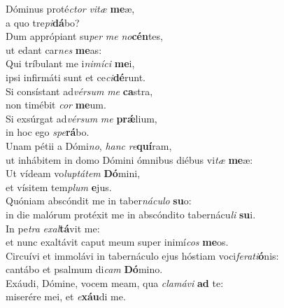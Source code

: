 \evenverse Dóminus proté\textit{ctor} \textit{vi}\textit{tæ} \textbf{me}æ,~\*\\
\evenverse a quo tre\textit{pi}\textbf{dá}bo?\\
\oddverse Dum apprópiant su\textit{per} \textit{me} \textit{no}\textbf{cén}tes,~\*\\
\oddverse ut edant car\textit{nes} \textbf{me}as:\\
\evenverse Qui tríbulant me i\textit{ni}\textit{mí}\textit{ci} \textbf{me}i,~\*\\
\evenverse ipsi infirmáti sunt et ce\textit{ci}\textbf{dé}runt.\\
\oddverse Si consístant ad\textit{vér}\textit{sum} \textit{me} \textbf{ca}stra,~\*\\
\oddverse non timébit \textit{cor} \textbf{me}um.\\
\evenverse Si exsúrgat ad\textit{vér}\textit{sum} \textit{me} \textbf{prǽ}lium,~\*\\
\evenverse in hoc ego \textit{spe}\textbf{rá}bo.\\
\oddverse Unam pétii a Dómi\textit{no}, \textit{hanc} \textit{re}\textbf{quí}ram,~\*\\
\oddverse ut inhábitem in domo Dómini ómnibus diébus vi\textit{tæ} \textbf{me}æ:\\
\evenverse Ut vídeam vo\textit{lup}\textit{tá}\textit{tem} \textbf{Dó}mini,~\*\\
\evenverse et vísitem tem\textit{plum} \textbf{e}jus.\\
\oddverse Quóniam abscóndit me in taber\textit{ná}\textit{cu}\textit{lo} \textbf{su}o:~\*\\
\oddverse in die malórum protéxit me in abscóndito tabernácu\textit{li} \textbf{su}i.\\
\evenverse In pe\textit{tra} \textit{e}\textit{xal}\textbf{tá}vit me:~\*\\
\evenverse et nunc exaltávit caput meum super inimí\textit{cos} \textbf{me}os.\\
\oddverse Circuívi et immolávi in tabernáculo ejus hóstiam voci\textit{fe}\textit{ra}\textit{ti}\textbf{ó}nis:~\*\\
\oddverse cantábo et psalmum di\textit{cam} \textbf{Dó}mino.\\
\evenverse Exáudi, Dómine, vocem meam, qua \textit{cla}\textit{má}\textit{vi} \textbf{ad} te:~\*\\
\evenverse miserére mei, et \textit{e}\textbf{xáu}di me.\\

